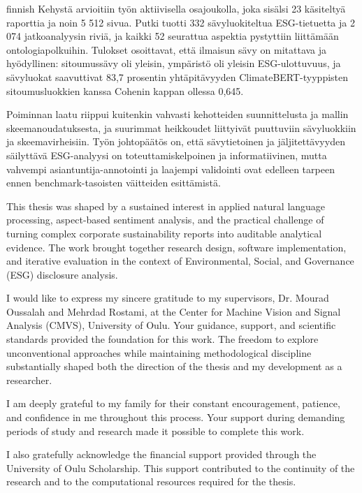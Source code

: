 \documentclass[english, online, cse, master]{dithesis}
\begin{document}
{\begin{thesisabstract}{finnish}
Kehystä arvioitiin työn aktiivisella osajoukolla, joka sisälsi 23 käsiteltyä
raporttia ja noin 5 512 sivua. Putki tuotti 332 sävyluokiteltua ESG-tietuetta
ja 2 074 jatkoanalyysin riviä, ja kaikki 52 seurattua aspektia pystyttiin
liittämään ontologiapolkuihin. Tulokset osoittavat, että ilmaisun sävy on
mitattava ja hyödyllinen: sitoumussävy oli yleisin, ympäristö oli yleisin
ESG-ulottuvuus, ja sävyluokat saavuttivat 83,7 prosentin yhtäpitävyyden
ClimateBERT-tyyppisten sitoumusluokkien kanssa Cohenin kappan ollessa 0,645.

Poiminnan laatu riippui kuitenkin vahvasti kehotteiden suunnittelusta ja mallin
skeemanoudatuksesta, ja suurimmat heikkoudet liittyivät puuttuviin sävyluokkiin
ja skeemavirheisiin. Työn johtopäätös on, että sävytietoinen ja
jäljitettävyyden säilyttävä ESG-analyysi on toteuttamiskelpoinen ja
informatiivinen, mutta vahvempi asiantuntija-annotointi ja laajempi validointi
ovat edelleen tarpeen ennen benchmark-tasoisten väitteiden esittämistä.
\end{thesisabstract}
}

\contents \thispagestyle{empty}
\header{\headerforeword}

This thesis was shaped by a sustained interest in applied natural language
processing, aspect-based sentiment analysis, and the practical challenge of
turning complex corporate sustainability reports into auditable analytical
evidence. The work brought together research design, software implementation,
and iterative evaluation in the context of Environmental, Social, and
Governance (ESG) disclosure analysis.

I would like to express my sincere gratitude to my supervisors, Dr. Mourad
Oussalah and Mehrdad Rostami, at the Center for Machine Vision and Signal
Analysis (CMVS), University of Oulu. Your guidance, support, and scientific
standards provided the foundation for this work. The freedom to explore
unconventional approaches while maintaining methodological discipline
substantially shaped both the direction of the thesis and my development as a
researcher.

I am deeply grateful to my family for their constant encouragement, patience,
and confidence in me throughout this process. Your support during demanding
periods of study and research made it possible to complete this work.

I also gratefully acknowledge the financial support provided through the
University of Oulu Scholarship. This support contributed to the continuity of
the research and to the computational resources required for the thesis.
\end{document}
